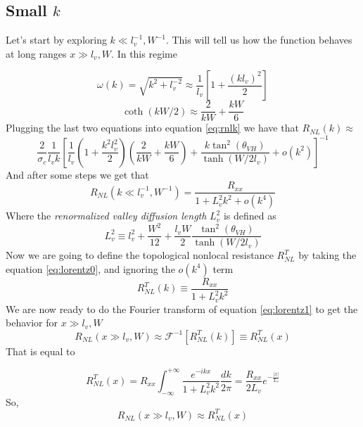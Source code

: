 \subsection{Small $k$}
Let's start by exploring $k\ll l_v^{-1},W^{-1}$. This will tell us how the function behaves at long ranges $x\gg l_v,W$. In this regime 

\begin{equation}
    \omega(k)=\sqrt{k^2+l_v^{-2}}\approx \frac 1{l_v}\left[1+\frac{(kl_v)^2}2\right]
\end{equation}
\begin{equation}
    \coth (kW/2)\approx \frac 2{kW} + \frac{kW}6
\end{equation}
Plugging the last two equations into equation \ref{eq:rnlk} we have that $R_{NL}(k)\approx$
\begin{equation}
    \frac 2{\sigma_c}\frac 1 {l_vk}\left[
        \frac 1{l_v}\left(1+\frac{k^2l_v^2}{2}\right)\left(\frac 2{kW} + \frac{kW}6\right)+
        \frac{k\tan^2(\theta_{VH})}{\tanh(W/2l_v)} + o(k^2)
    \right]^{-1}
\end{equation}
And after some steps we get that
\begin{equation}
    R_{NL}(k\ll l_v^{-1},W^{-1})=
    \frac {R_{xx}}{1+L_v^2k^2 + o(k^4)}
    \label{eq:lorentz0}
\end{equation}
Where the \textit{renormalized valley diffusion length} $L_v^2$ is defined as
\begin{equation}
    L_v^2 \equiv l_v^2+\frac {W^2}{12} +\frac{l_vW}2 \frac{\tan^2(\theta_{VH})}{\tanh(W/2l_v)}
\end{equation}
Now we are going to define the topological nonlocal resistance $R_{NL}^T$ by taking the equation \ref{eq:lorentz0}, and ignoring the $o(k^4)$ term
\begin{equation}
    R_{NL}^T(k)\equiv
    \frac {R_{xx}}{1+L_v^2k^2}
    \label{eq:lorentz1}
\end{equation} 
We are now ready to do the Fourier transform of equation \ref{eq:lorentz1} to get the behavior for $x\gg l_v,W$
\begin{equation}
    R_{NL}(x\gg l_v,W)\approx\mathcal F^{-1}\left[R_{NL}^T(k)\right]\equiv R_{NL}^T(x)
\end{equation}
That is equal to 

\begin{equation}
    R_{NL}^T(x)=
    R_{xx}\int_{-\infty}^{+\infty}
    \frac {e^{-ikx}}{1+L_v^2k^2}
    \frac {dk}{2\pi}=
    \frac{R_{xx}}{2L_v}e^{-\frac{|x|}{L_v}}
\end{equation}
So,
\begin{equation}
    R_{NL}(x\gg l_v,W)\approx R_{NL}^T(x)
    \label{eq:rxg}
\end{equation}

